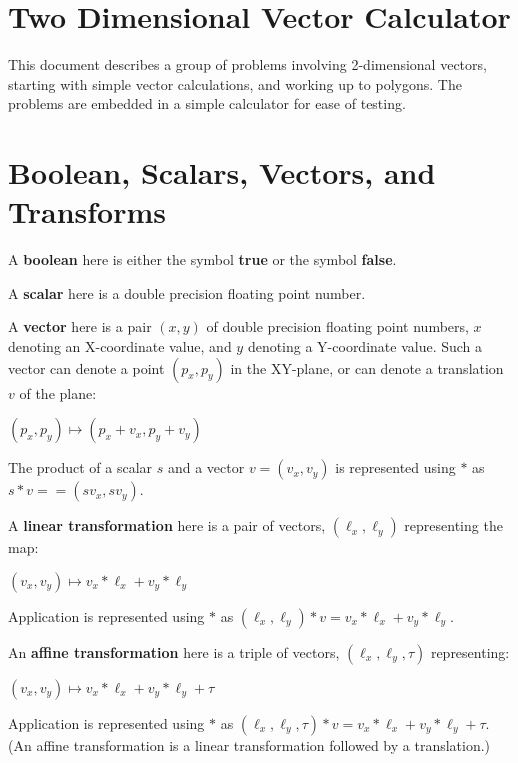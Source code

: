 \documentclass[12pt]{article}
\begin{document}
\newcommand{\header}[1]{\underline{\bf #1}}
\newcommand{\file}[1]{{\bf #1}}
\newcommand{\blankpage}{\newpage\vspace*{3.5in}%
    \centerline{\Large This Page is Intentionally Left Blank}}
\setlength{\parindent}{0.0in}
\setlength{\parskip}{1ex}
\newcommand{\key}[1]{{\bf #1}}
\newcommand{\TT}[1]{{\tt \bfseries #1}}
\newcommand{\EOL}{\penalty \exhyphenpenalty}
\newtheorem{definition}{Definition}[section]
\newtheorem{lemma}{Lemma}[section]
\newenvironment{indpar}[1]%
    {\begin{list}{}{\setlength{\leftmargin}{#1}}\item[]}%
    {\end{list}}

\section{Two Dimensional Vector Calculator}
This document describes a group of problems involving 2-dimensional vectors,
starting with simple vector calculations, and working up to polygons.
The problems are embedded in a simple calculator for ease of
testing.

\section{Boolean, Scalars, Vectors, and Transforms}
A \key{boolean} here is either the symbol \key{true} or the symbol \key{false}.

A \key{scalar} here is a double precision floating point number.

A \key{vector} here is a pair $(x,y)$ of double precision floating point
numbers, $x$ denoting an X-coordinate value, and $y$ denoting a
Y-coordinate value.  Such a vector can denote a point $(p_x,p_y)$ in the
XY-plane, or can denote a translation $v$ of the plane:
\centerline{$(p_x,p_y) \longmapsto (p_x+v_x,p_y+v_y)$}

The product of a scalar $s$ and a vector $v=(v_x,v_y)$ is represented using
$*$ as $s*v == (sv_x,sv_y)$.

A \key{linear transformation} here is a pair of vectors, $(\ell_x,\ell_y)$
representing the map:
\centerline{$(v_x,v_y) \longmapsto v_x*\ell_x+v_y*\ell_y$}
Application is represented using
$*$ as $(\ell_x,\ell_y)*v=v_x*\ell_x+v_y*\ell_y$.

An \key{affine transformation} here is a triple of vectors,
$(\ell_x,\ell_y,\tau)$
representing: \\
\centerline{$(v_x,v_y) \longmapsto v_x*\ell_x+v_y*\ell_y+\tau$}
Application is represented using
$*$ as $(\ell_x,\ell_y,\tau)*v=v_x*\ell_x+v_y*\ell_y+\tau$. \\
(An affine transformation is a linear transformation followed by
a translation.)
\end{document}
